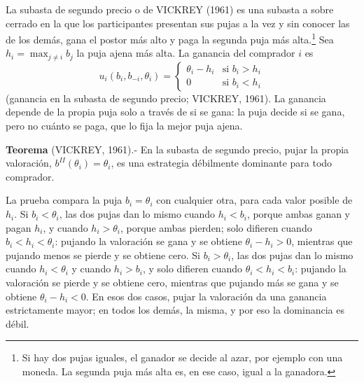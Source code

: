 \documentclass[10pt,a4paper]{article}
\begin{document}
La subasta de segundo precio o de VICKREY (1961) es una subasta a sobre cerrado en la que los participantes presentan sus pujas a la vez y sin conocer las de los demás, gana el postor más alto y paga la segunda puja más alta.\footnote{%
  Si hay dos pujas iguales, el ganador se decide al azar, por ejemplo con una moneda. La segunda puja más alta es, en ese caso, igual a la ganadora.
} Sea $h_i=\max_{j\neq i}b_j$ la puja ajena más alta. La ganancia del comprador $i$ es
$$u_i(b_i,b_{-i},\theta_i)=\begin{cases}\theta_i-h_i&\text{si }b_i>h_i\\ 0&\text{si }b_i<h_i\end{cases}$$
(ganancia en la subasta de segundo precio; VICKREY, 1961). La ganancia depende de la propia puja solo a través de si se gana: la puja decide si se gana, pero no cuánto se paga, que lo fija la mejor puja ajena.

\textbf{Teorema} (VICKREY, 1961).- En la subasta de segundo precio, pujar la propia valoración, $b^{II}(\theta_i)=\theta_i$, es una estrategia débilmente dominante para todo comprador.

La prueba compara la puja $b_i=\theta_i$ con cualquier otra, para cada valor posible de $h_i$. Si $b_i<\theta_i$, las dos pujas dan lo mismo cuando $h_i<b_i$, porque ambas ganan y pagan $h_i$, y cuando $h_i>\theta_i$, porque ambas pierden; solo difieren cuando $b_i<h_i<\theta_i$: pujando la valoración se gana y se obtiene $\theta_i-h_i>0$, mientras que pujando menos se pierde y se obtiene cero. Si $b_i>\theta_i$, las dos pujas dan lo mismo cuando $h_i<\theta_i$ y cuando $h_i>b_i$, y solo difieren cuando $\theta_i<h_i<b_i$: pujando la valoración se pierde y se obtiene cero, mientras que pujando más se gana y se obtiene $\theta_i-h_i<0$. En esos dos casos, pujar la valoración da una ganancia estrictamente mayor; en todos los demás, la misma, y por eso la dominancia es débil.
\end{document}
